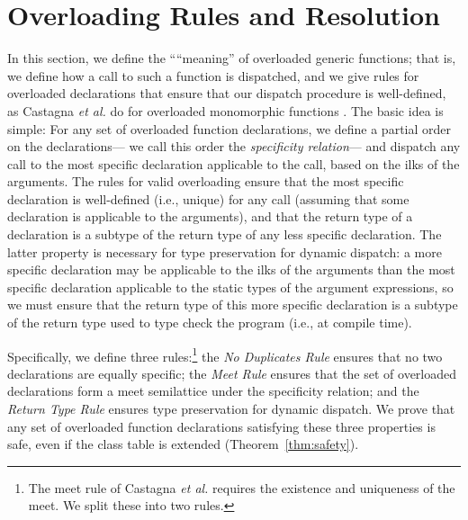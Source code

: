 \documentclass[10pt]{sigplanconf}
\begin{document}
\section{Overloading Rules and Resolution}\label{sec:rules}
In this section, 
we define the ````meaning'' of overloaded generic functions; 
that is,
we define how a call to such a function is dispatched, 
and we give rules for overloaded declarations 
that ensure that our dispatch procedure is well-defined, 
as Castagna \emph{et al.} 
do for overloaded monomorphic functions \cite{castagna95}.
The basic idea is simple:
For any set of overloaded function declarations, 
we define a partial order on the declarations---%
we call this order the \emph{specificity relation}---%
and dispatch any call to the most specific declaration applicable to the call,
based on the ilks of the arguments.
The rules for valid overloading ensure
that the most specific declaration is well-defined (i.e., unique) for any call 
(assuming that some declaration is applicable to the arguments), 
and that the return type of a declaration 
is a subtype of the return type of any less specific declaration.
The latter property is necessary for type preservation for dynamic dispatch:
a more specific declaration may be applicable 
to the ilks of the arguments 
than 
the most specific declaration applicable 
to the static types of the argument expressions, 
so we must ensure that the return type of this more specific declaration 
is a subtype of the return type used to type check the program 
(i.e., at compile time).

Specifically, 
we define three rules:\footnote{%
The meet rule of Castagna \emph{et al.} 
requires the existence and uniqueness of the meet.
We split these into two rules.}
the \emph{No Duplicates Rule} ensures that no two declarations are equally specific; 
the \emph{Meet Rule} ensures that the set of overloaded declarations
form a meet semilattice under the specificity relation; 
and the \emph{Return Type Rule} ensures type preservation for dynamic dispatch.
We prove that any set of overloaded function declarations 
satisfying these three properties is safe,
even if the class table is extended 
(Theorem~\ref{thm:safety}).

\end{document}
